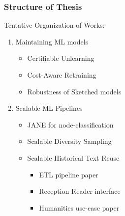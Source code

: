 \documentclass[pdf]{beamer}
\begin{document}
\begin{frame}
    \frametitle{Structure of Thesis}
    Tentative Organization of Works:
    \begin{enumerate}
        \item Maintaining ML models
        \begin{itemize}
            \item Certifiable Unlearning \cite{mahadevan2022certifiable}
            \item Cost-Aware Retraining \cite{mahadevan2023costeffective}
            \item Robustness of Sketched models \cite{10.1145/3511808.3557687}
        \end{itemize} 
        \item Scalable ML Pipelines
        \begin{itemize}
            \item JANE for node-classification \cite{merchant2022JANE}
            \item Scalable Diversity Sampling 
            \item Scalable Historical Text Reuse
            \begin{itemize}
                \item ETL pipeline paper 
                \item Reception Reader interface \cite{Rosson-2023}
                \item Humanities use-case paper
            \end{itemize}
        \end{itemize}
    \end{enumerate}
    

\end{frame}
\end{document}
